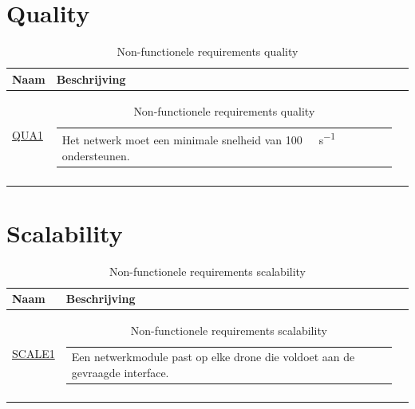 \documentclass[a4paper, 11pt, oneside]{report}
\begin{document}
\section{Quality}

\begin{longtable}{|l|l|l|}
	\hline
	\rowcolor[HTML]{C0C0C0} 
	Naam & Beschrijving \\ \hline
	\endhead
	\hyperlink{QUA1}{QUA1}			&\begin{tabular}[c]{@{}l@{}} Het netwerk moet een minimale snelheid van \SI{100}{\kilo\bit\per\second} ondersteunen. \end{tabular}\\ \hline
	\caption{Non-functionele requirements quality}
	\label{tab:nietfunctionelecriteria:quality}
\end{longtable}

\section{Scalability}

\begin{longtable}{|l|l|l|}
	\hline
	\rowcolor[HTML]{C0C0C0} 
	Naam & Beschrijving \\ \hline
	\endhead
	\hyperlink{SCALE1}{SCALE1}			&\begin{tabular}[c]{@{}l@{}} Een netwerkmodule past op elke drone die voldoet aan de gevraagde interface.	\end{tabular}\\ \hline
	\caption{Non-functionele requirements scalability}
	\label{tab:nietfunctionelecriteria:scalability}
\end{longtable}




\clearpage
\appendix
\end{document}
